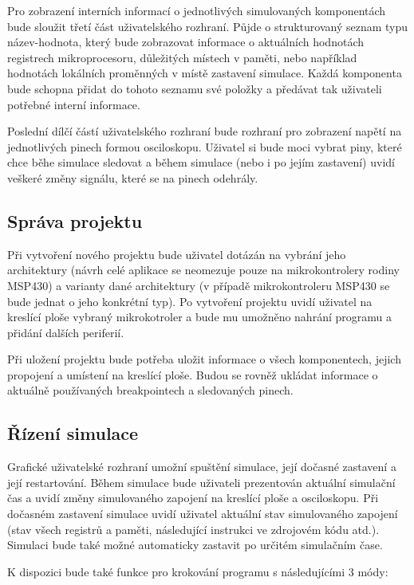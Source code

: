 Pro zobrazení interních informací o jednotlivých simulovaných komponentách bude sloužit třetí část uživatelského rozhraní. Půjde o strukturovaný seznam
typu název-hodnota, který bude zobrazovat informace o aktuálních hodnotách registrech mikroprocesoru, důležitých místech v paměti, nebo například hodnotách
lokálních proměnných v místě zastavení simulace. Každá komponenta bude schopna přidat do tohoto seznamu své položky a předávat tak uživateli potřebné
interní informace.

Poslední dílčí částí uživatelského rozhraní bude rozhraní pro zobrazení napětí na jednotlivých pinech formou osciloskopu. Uživatel si bude moci vybrat
piny, které chce běhe simulace sledovat a během simulace (nebo i po jejím zastavení) uvidí veškeré změny signálu, které se na pinech odehrály.

\subsection{Správa projektu}

Při vytvoření nového projektu bude uživatel dotázán na vybrání jeho architektury (návrh celé aplikace se neomezuje pouze na mikrokontrolery rodiny MSP430) a varianty dané architektury (v případě mikrokontroleru MSP430 se bude jednat o jeho konkrétní typ). Po vytvoření projektu uvidí uživatel na kreslící ploše vybraný mikrokotroler a bude mu umožněno nahrání programu a přidání dalších periferií.

Při uložení projektu bude potřeba uložit informace o všech komponentech, jejich propojení a umístení na kreslící ploše. Budou se rovněž ukládat informace
o aktuálně používaných breakpointech a sledovaných pinech.


\subsection{Řízení simulace}

Grafické uživatelské rozhraní umožní spuštění simulace, její dočasné zastavení a její restartování. Během simulace bude uživateli prezentován aktuální simulační čas a uvidí změny simulovaného zapojení na kreslící ploše a osciloskopu. Při dočasném zastavení simulace uvidí uživatel aktuální
stav simulovaného zapojení (stav všech registrů a paměti, následující instrukci ve zdrojovém kódu atd.). Simulaci bude také možné automaticky zastavit po určitém simulačním čase.

K dispozici bude také funkce pro krokování programu s následujícími 3 módy:

